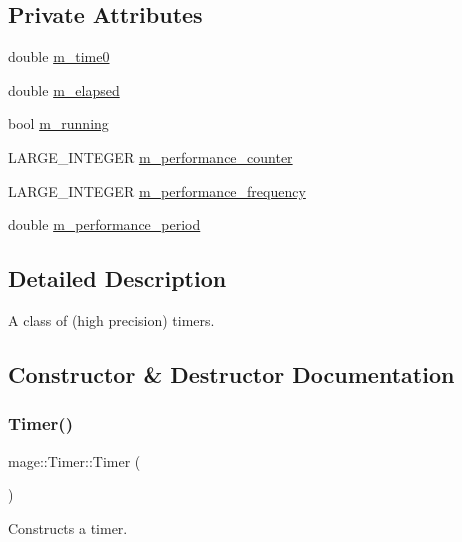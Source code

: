 \subsection*{Private Attributes}
\begin{DoxyCompactItemize}
\item 
double \hyperlink{classmage_1_1_timer_a73fa08d14bfa273f158f967a8e58f96f}{m\+\_\+time0}
\item 
double \hyperlink{classmage_1_1_timer_aa2c50b9ffa85600791a21e2db4c43e91}{m\+\_\+elapsed}
\item 
bool \hyperlink{classmage_1_1_timer_ac8d975843e5b2199848284de910d3291}{m\+\_\+running}
\item 
L\+A\+R\+G\+E\+\_\+\+I\+N\+T\+E\+G\+ER \hyperlink{classmage_1_1_timer_a70bdbf53f8cd69a46db8b75e08d3ead8}{m\+\_\+performance\+\_\+counter}
\item 
L\+A\+R\+G\+E\+\_\+\+I\+N\+T\+E\+G\+ER \hyperlink{classmage_1_1_timer_a1618c4901b6f898165a2d79d02a2518e}{m\+\_\+performance\+\_\+frequency}
\item 
double \hyperlink{classmage_1_1_timer_a5831e973d64389b1d98fbb6c51de6436}{m\+\_\+performance\+\_\+period}
\end{DoxyCompactItemize}


\subsection{Detailed Description}
A class of (high precision) timers. 

\subsection{Constructor \& Destructor Documentation}
\hypertarget{classmage_1_1_timer_a5e1c0a3bb4491b3a43ce05874ad24055}{}\label{classmage_1_1_timer_a5e1c0a3bb4491b3a43ce05874ad24055} 
\subsubsection{\texorpdfstring{Timer()}{Timer()}}
{\footnotesize\ttfamily mage\+::\+Timer\+::\+Timer (\begin{DoxyParamCaption}{ }\end{DoxyParamCaption})}

Constructs a timer. \hypertarget{classmage_1_1_timer_aa91cebe8c59c189fde93932fde10265c}{}\label{classmage_1_1_timer_aa91cebe8c59c189fde93932fde10265c} 
